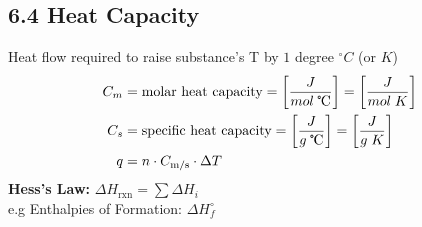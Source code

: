 \subsection{6.4 Heat Capacity}
    Heat flow required to raise substance's T by $1$ degree $^\circ C$ (or $K$)
    \begin{align*}
        C_m & = \text{molar heat capacity} = \left[\frac{J}{mol \; \tccentigrade}\right] = \left[\frac{J}{mol \; K}\right]\\
        C_s & = \text{specific heat capacity} = \left[\frac{J}{g \; \tccentigrade}\right] = \left[\frac{J}{g \; K}\right]\\
        q & = n \cdot C_\text{m/s} \cdot \Delta T
    \end{align*}
    \textbf{Hess's Law:} $\Delta H_\text{rxn} = \sum \Delta H_i$\\
    e.g Enthalpies of Formation: $\Delta H^\circ_f$
